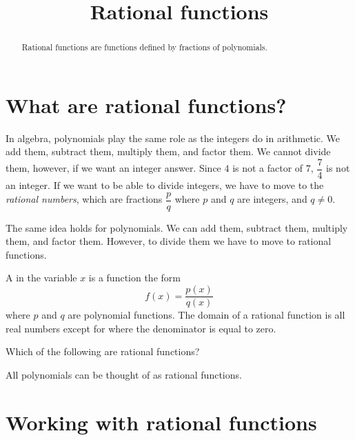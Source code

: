 \documentclass{ximera}
\title[Dig-In:]{Rational functions}
\begin{document}
\begin{abstract}
  Rational functions are functions defined by fractions of
  polynomials.
\end{abstract}
\maketitle


\section{What are rational functions?}
In algebra, polynomials play the same role as the integers do in arithmetic.  We add them, subtract them, multiply them, and factor them.  We cannot 
divide them, however, if we want an integer answer.  Since $4$ is not a factor of $7$, $\dfrac{7}{4}$ is not an integer.  If we want to be able to divide
integers, we have to move to the \emph{rational numbers}, which are fractions $\dfrac{p}{q}$ where $p$ and $q$ are integers, and $q \ne 0$.

The same idea holds for polynomials.  We can add them, subtract them, multiply them, and factor them.  However, to divide them we have to move
to rational functions.

\begin{definition}
  A  in the variable $x$ is a function the form
  \[
  f(x) = \frac{p(x)}{q(x)}
  \]
  where $p$ and $q$ are polynomial functions. The domain of a rational
  function is all real numbers except for where the denominator is
  equal to zero.
\end{definition}

\begin{question}
  Which of the following are rational functions?
  \begin{selectAll}
  \end{selectAll}
  \begin{feedback}
    All polynomials can be thought of as rational functions.
  \end{feedback}
\end{question}



\section{Working with rational functions}
\end{document}

